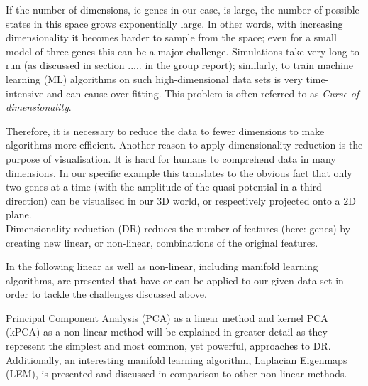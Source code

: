 \documentclass[journal, a4paper]{IEEEtran}
\begin{document}



If the number of dimensions, ie genes in our case, is large, the number of possible states in this space grows exponentially large. In other words, with increasing dimensionality it becomes harder to sample from the space; even for a small model of three genes this can be a major challenge. Simulations take very long to run (as discussed in section ..... in the group report); similarly, to train machine learning (ML) algorithms on such high-dimensional data sets is very time-intensive and can cause over-fitting. %
This problem is often referred to as \textit{Curse of dimensionality}.

Therefore, it is necessary to reduce the data to fewer dimensions to make algorithms more efficient. 
Another reason to apply dimensionality reduction is the purpose of visualisation. It is hard for humans to comprehend data in many dimensions. In our specific example this translates to the obvious fact that only two genes at a time (with the amplitude of the quasi-potential in a third direction) can be visualised in our 3D world, or respectively projected onto a 2D plane.\\

Dimensionality reduction (DR) reduces the number of features (here: genes) by creating new linear, or non-linear, combinations of the original features.


In the following linear as well as non-linear, including manifold learning algorithms, are presented that have or can be applied to our given data set in order to tackle the challenges discussed above.

Principal Component Analysis (PCA) as a linear method and kernel PCA (kPCA) as a non-linear method will be explained in greater detail as they represent the simplest and most common, yet powerful, approaches to DR.
Additionally, an interesting manifold learning algorithm, Laplacian Eigenmaps (LEM), is presented and discussed in comparison to other non-linear methods.
\end{document}
